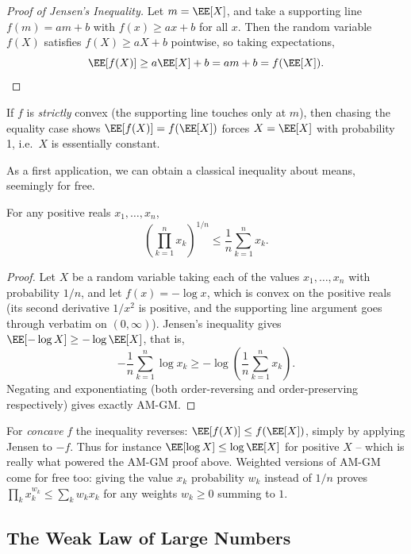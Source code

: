 \begin{proof}[Proof of Jensen's Inequality]
	Let $m = \EE[X]$, and take a supporting line $f(m) = am + b$ with $f(x) \geq ax + b$ for all $x$. Then the random variable $f(X)$ satisfies $f(X) \geq aX + b$ pointwise, so taking expectations,
	$$
	\EE[f(X)] \geq a\EE[X] + b = am + b = f(\EE[X]). \qedhere
	$$
\end{proof}

\begin{remark}
	If $f$ is \emph{strictly} convex (the supporting line touches only at $m$), then chasing the equality case shows $\EE[f(X)] = f(\EE[X])$ forces $X = \EE[X]$ with probability 1, i.e.\ $X$ is essentially constant.
\end{remark}

As a first application, we can obtain a classical inequality about means, seemingly for free.

\begin{corollary}[AM-GM Inequality]
	For any positive reals $x_1, \dots, x_n$,
	$$
	\left(\prod_{k = 1}^{n} x_k\right)^{1/n} \leq \frac{1}{n}\sum_{k = 1}^{n} x_k.
	$$
\end{corollary}
\begin{proof}
	Let $X$ be a random variable taking each of the values $x_1, \dots, x_n$ with probability $1/n$, and let $f(x) = -\log x$, which is convex on the positive reals (its second derivative $1/x^2$ is positive, and the supporting line argument goes through verbatim on $(0,\infty)$). Jensen's inequality gives $\EE[-\log X] \geq -\log \EE[X]$, that is,
	$$
	-\frac{1}{n}\sum_{k=1}^n \log x_k \geq -\log\left(\frac{1}{n}\sum_{k=1}^n x_k\right).
	$$
	Negating and exponentiating (both order-reversing and order-preserving respectively) gives exactly AM-GM.
\end{proof}

\begin{remark}
	For \emph{concave} $f$ the inequality reverses: $\EE[f(X)] \leq f(\EE[X])$, simply by applying Jensen to $-f$. Thus for instance $\EE[\log X] \leq \log \EE[X]$ for positive $X$ -- which is really what powered the AM-GM proof above. Weighted versions of AM-GM come for free too: giving the value $x_k$ probability $w_k$ instead of $1/n$ proves $\prod_k x_k^{w_k} \leq \sum_k w_k x_k$ for any weights $w_k \geq 0$ summing to $1$.
\end{remark}

\subsection{The Weak Law of Large Numbers}


